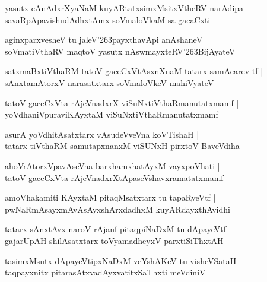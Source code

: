 \documentclass[twoside,12pt,openright]{book}
\def\S{\char'263}
\newcounter{shloka}[chapter]
\begin{document}
\begin{shloka}
yasutx cAnAdxrXyaNaM kuyARtatxsimxMsitxVtheRV narAdipa |\\
savaRpApavishudAdhxtAmx soVmaloVkaM sa gacaCxti 
\end{shloka}

\begin{shloka}
aginxparxvesheV tu jaleV\S payxthavApi anAshaneV |\\
soVmatiVthaRV maqtoV yasutx nAswmayxteRV\S BijAyateV 
\end{shloka}

\begin{shloka}
satxmaBxtiVthaRM tatoV gaceCxVtAsxnXnaM tatarx samAcarev tf |\\
sAnxtamAtorxV narasatxtarx soVmaloVkeV mahiVyateV 
\end{shloka}

\begin{shloka}
tatoV gaceCxVta rAjeVnadxrX viSuNxtiVthaRmanutatxmamf |\\
yoVdhaniVpuraviKAyxtaM viSuNxtiVthaRmanutatxmamf 
\end{shloka}

\begin{shloka}
asurA yoVdhitAsatxtarx vAsudeVveVna koVTishaH |\\
tatarx tiVthaRM samutapxnanxM viSUNxH pirxtoV BaveVdiha
\end{shloka}

\begin{shloka}
ahoVrAtorxVpavAseVna barxhamxhatAyxM vayxpoVhati |\\
tatoV gaceCxVta rAjeVnadxrXtApaseVshavxramatatxmamf
\end{shloka}

\begin{shloka}
amoVhakamiti KAyxtaM pitaqMsatxtarx tu tapaRyeVtf |\\
pwNaRmAsayxmAvAsAyxshArxdadhxM kuyARdayxthAvidhi
\end{shloka}

\begin{shloka}
tatarx sAnxtAvx naroV rAjanf pitaqpiNaDxM tu dApayeVtf |\\
gajarUpAH shilAsatxtarx toVyamadheyxV parxtiSiThxtAH 
\end{shloka}

\begin{shloka}
tasimxMsutx dApayeVtipxNaDxM veYshAKeV tu visheVSataH |\\
taqpayxnitx pitarasAtxvadAyxvatitxSaThxti meVdiniV 
\end{shloka}
\end{document}
